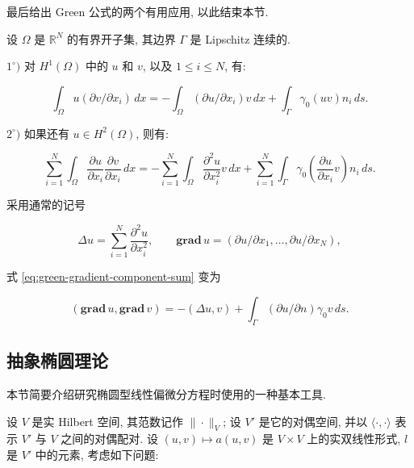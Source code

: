 
最后给出 Green 公式的两个有用应用, 以此结束本节.

\setcounter{statement}{3}
\renewcommand{\theHstatement}{lemma.\thesection.\arabic{statement}}
\begin{Lemma}\label{lem:green-formula-applications}
设 $\Omega$ 是 $\mathbb R^N$ 的有界开子集, 其边界 $\Gamma$ 是 Lipschitz 连续的.

$1^\circ)$ 对 $H^1(\Omega)$ 中的 $u$ 和 $v$, 以及 $1\leq i\leq N$, 有:

\begin{equation}\label{eq:green-first-identity-component}
\int_\Omega u(\partial v/\partial x_i)\,dx=-\int_\Omega(\partial u/\partial x_i)v\,dx+\int_\Gamma\gamma_0(uv)n_i\,ds.
\end{equation}

$2^\circ)$ 如果还有 $u\in H^2(\Omega)$, 则有:

\begin{equation}\label{eq:green-gradient-component-sum}
\sum_{i=1}^N\int_\Omega\frac{\partial u}{\partial x_i}\frac{\partial v}{\partial x_i}\,dx=-\sum_{i=1}^N\int_\Omega\frac{\partial^2u}{\partial x_i^2}v\,dx+\sum_{i=1}^N\int_\Gamma\gamma_0\left(\frac{\partial u}{\partial x_i}v\right)n_i\,ds.
\end{equation}

采用通常的记号

\[
\Delta u=\sum_{i=1}^N\frac{\partial^2u}{\partial x_i^2},\qquad \mathbf{grad}\,u=(\partial u/\partial x_1,\ldots,\partial u/\partial x_N),
\]

式 \eqref{eq:green-gradient-component-sum} 变为

\begin{equation}\label{eq:green-first-identity}
(\mathbf{grad}\,u,\mathbf{grad}\,v)=-(\Delta u,v)+\int_\Gamma(\partial u/\partial n)\gamma_0v\,ds.
\end{equation}
\end{Lemma}

\subsection{抽象椭圆理论}\label{subsec:abstract-elliptic-theory}

本节简要介绍研究椭圆型线性偏微分方程时使用的一种基本工具.

设 $V$ 是实 Hilbert 空间, 其范数记作 $\|\cdot\|_V$; 设 $V'$ 是它的对偶空间, 并以 $\langle\cdot,\cdot\rangle$ 表示 $V'$ 与 $V$ 之间的对偶配对. 设 $(u,v)\mapsto a(u,v)$ 是 $V\times V$ 上的实双线性形式, $l$ 是 $V'$ 中的元素, 考虑如下问题:

